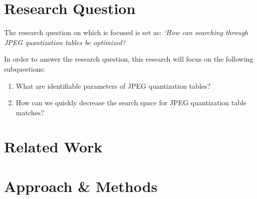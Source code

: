 \documentclass[a4paper,8pt]{article}
\begin{document}





\section*{Research Question}

The research question on which is focused is set as: \textit{`How can searching through JPEG quantization tables be optimized?}

In order to answer the research question, this research will focus on the following subquestions:
\begin{enumerate}
\item What are identifiable parameters of JPEG quantization tables?
\item How can we quickly decrease the search space for JPEG quantization table matches?
\end{enumerate}

\section*{Related Work}

\section*{Approach \& Methods}
\end{document}
